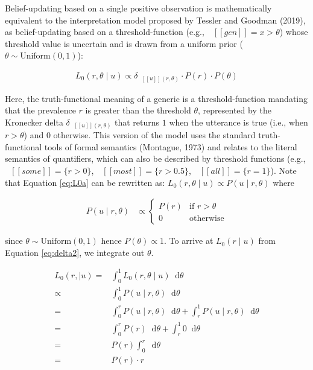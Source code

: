 \documentclass[floatsintext,doc]{apa6}
\begin{document}
Belief-updating based on a single positive observation is mathematically equivalent to the interpretation model proposed by Tessler and Goodman (2019), as belief-updating based on a threshold-function (e.g., \(\mbox{ $[\![ gen ]\!]$} = x > \theta\)) whose threshold value is uncertain and is drawn from a uniform prior (\(\theta \sim \text{Uniform}(0, 1)\)):

\begin{align}
L_0(r, \theta \mid u) \propto {\delta_{\mbox{ $[\![ u ]\!]$}(r, \theta)} \cdot P(r) \cdot P(\theta)} \label{eq:L0a}
\end{align}

Here, the truth-functional meaning of a generic is a threshold-function mandating that the prevalence \(r\) is greater than the threshold \(\theta\), represented by the Kronecker delta \(\delta_{\mbox{ $[\![ u ]\!]$}(r, \theta)}\) that returns \(1\) when the utterance is true (i.e., when \(r > \theta\)) and \(0\) otherwise.
%
%
This version of the model uses the standard truth-functional tools of formal semantics (Montague, 1973) and relates to the literal semantics of quantifiers, which can also be described by threshold functions (e.g., \(\mbox{ $[\![ some ]\!]$} = \{r > 0\}\), \(\mbox{ $[\![ most ]\!]$} = \{r > 0.5\}\), \(\mbox{ $[\![ all ]\!]$} = \{r = 1\}\)).
Note that Equation \ref{eq:L0a} can be rewritten as: \(L_0(r, \theta \mid u) \propto P(u \mid r, \theta)\) where

\begin{align}
P(u \mid r, \theta)  &\propto \begin{cases}
P(r) & \text{if } r > \theta \\
0 & \text{otherwise} \end{cases} \label{eq:delta2}
\end{align}

\noindent since \(\theta \sim \text{Uniform}(0, 1)\) hence \(P(\theta) \propto 1\). To arrive at \(L_0(r \mid u)\) from Equation \ref{eq:delta2}, we integrate out \(\theta\).

\begin{align}
L_0(r, \mid u) =& \int_{0}^{1} L_0(r, \theta \mid u) \mathop{}\!\mathrm{d}\theta \nonumber \\
\propto& \int_{0}^{1} P(u \mid r, \theta)  \mathop{}\!\mathrm{d}\theta \nonumber \\
=& \int_{0}^{r} P(u \mid r, \theta) \mathop{}\!\mathrm{d}\theta + \int_{r}^{1}P(u \mid r, \theta) \mathop{}\!\mathrm{d}\theta \nonumber \\
=& \int_{0}^{r} P(r) \mathop{}\!\mathrm{d}\theta + \int_{r}^{1} 0 \mathop{}\!\mathrm{d}\theta \nonumber  \\ 
   = &  P(r) \int_{0}^{r} \mathop{}\!\mathrm{d}\theta \nonumber \\
     =&   P(r) \cdot r \label{eq:L0d}
\end{align}
\end{document}
